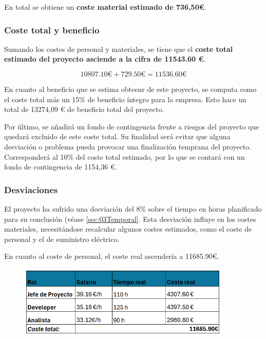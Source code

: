 En total se obtiene un \textbf{coste material estimado de 736,50€}.

\subsubsection{Coste total y beneficio}

Sumando los costes de personal y materiales, se tiene que el \textbf{coste total estimado del proyecto asciende a la cifra de 11543.60 €}.

\begin{equation}
    10807.10\text{€} + 729.50\text{€} =  11536.60 \text{€}
\end{equation}

En cuanto al beneficio que se estima obteenr de este proyecto, se computa como el coste total más un 15\% de beneficio íntegro para la empresa. Esto hace un total de 13274,09 € de beneficio total del proyecto.

Por último, se añadirá un fondo de contingencia frente a riesgos del proyecto que quedará excluido de este coste total. Su finalidad será evitar que alguna desviación o problema pueda provocar una finalización temprana del proyecto. Corresponderá al 10\% del coste total estimado, por lo que se contará con un fondo de contingencia de 1154,36 €.

\subsubsection{Desviaciones}

El proyecto ha sufrido una desviación del 8\% sobre el tiempo en horas planificado para su conclusión (véase \ref{sec:03Temporal}. Esta desviación influye en los costes materiales, necesitándose recalcular algunos costes estimados, como el coste de personal y el de suministro eléctrico. 

En cuanto al coste de personal, el coste real ascendería a 11685.90€.%

\begin{figure}[H]
    \centering
    \includegraphics[width=0.90\textwidth]{tables/costeRealcap.png}
    \label{table:costeRealcap}
\end{figure}

